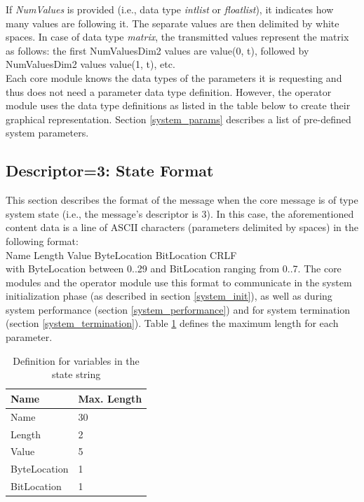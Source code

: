 \documentclass[letterpaper,oneside,12pt]{book}
\begin{document}
If \textit{NumValues} is provided (i.e., data type \textit{intlist} or 
\textit{floatlist}), it indicates how many values are following it. The separate 
values are then delimited by white spaces. In case of data type \textit{matrix}, 
the transmitted values represent the matrix as follows: the first NumValuesDim2 
values are value(0, t), followed by NumValuesDim2 values value(1, t), etc. \\

Each core module knows the data types of the parameters it is requesting and 
thus does not need a parameter data type definition. However, the operator 
module uses the data type definitions as listed in the table below to create 
their graphical representation. Section \ref{system_params} describes a list of 
pre-defined system parameters.


\subsection{Descriptor=3: State Format}
\label{state_format}

This section describes the format of the message when the core message is of 
type system state (i.e., the message's descriptor is 3). In this case, the 
aforementioned content data is a line of ASCII characters (parameters
delimited by spaces) in the following format:
\\[2ex]
Name Length Value ByteLocation BitLocation CRLF
\\[2ex]
with ByteLocation between 0..29 and BitLocation ranging from 0..7. The core 
modules and the operator module use this format to communicate in the system 
initialization phase (as described in section \ref{system_init}), as well as 
during system performance (section \ref{system_performance}) and for system 
termination (section \ref{system_termination}). Table \ref{state_table} 
defines the maximum length for each parameter.

\begin{table}[ht]
 \centering
 \begin{tabular}{|l|l|}
  \hline
  \textbf{Name} & \textbf{Max. Length} \\
  \hline
  Name & 30 \\
  \hline
  Length & 2 \\
  \hline
  Value & 5 \\
  \hline
  ByteLocation & 1 \\
  \hline
  BitLocation & 1 \\
  \hline
 \end{tabular}
 \caption{Definition for variables in the state string}
 \label{state_table}
\end{table}   
\end{document}
